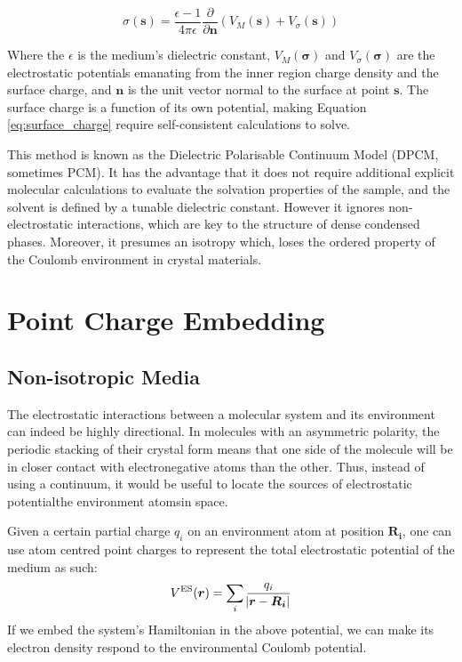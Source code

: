 \begin{equation}
    \sigma (\bm{s}) = \frac{\epsilon - 1}{4\pi \epsilon} \frac{\partial}{\partial \bm{n}} (V_M(\bm{s}) + V_{\sigma}(\bm{s}))
    \label{eq:surface_charge}
\end{equation}

Where the $\epsilon$ is the medium's dielectric constant, $V_M(\bm{\sigma})$ and $V_{\sigma}(\bm{\sigma})$ are the electrostatic potentials emanating from the inner region charge density and the surface charge, and $\bm{n}$ is the unit vector normal to the surface at point $\bm{s}$. The surface charge is a function of its own potential, making Equation \ref{eq:surface_charge} require self-consistent calculations to solve.

This method is known as the Dielectric Polarisable Continuum Model (DPCM, sometimes PCM). It has the advantage that it does not require additional explicit molecular calculations to evaluate the solvation properties of the sample, and the solvent is defined by a tunable dielectric constant. However it ignores non-electrostatic interactions, which are key to the structure of dense condensed phases. Moreover, it presumes an isotropy which, loses the ordered property of the Coulomb environment in crystal materials.

\section{Point Charge Embedding}
\label{sec:pce}
\subsection{Non-isotropic Media}
The electrostatic interactions between a molecular system and its environment can indeed be highly directional. In molecules with an asymmetric polarity, the periodic stacking of their crystal form means that one side of the molecule will be in closer contact with electronegative atoms than the other. Thus, instead of using a continuum, it would be useful to locate the sources of electrostatic potential\textemdash{}the environment atoms\textemdash{}in space.

Given a certain partial charge $q_i$ on an environment atom at position $\bm{R_i}$, one can use atom centred point charges to represent the total electrostatic potential of the medium as such:
\begin{equation}
    V^{\text{ES}}(\bm{r})=\sum_i \frac{q_i}{\abs{\bm{r}-\bm{R_i}}}
    \label{eq:point_char}
\end{equation}
If we embed the system's Hamiltonian in the above potential, we can make its electron density respond to the environmental Coulomb potential.

